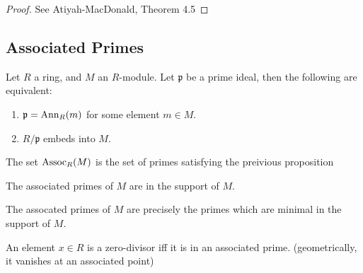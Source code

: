 \begin{proof}
    See Atiyah-MacDonald, Theorem 4.5
\end{proof}



\subsection{Associated Primes}


\begin{proposition}
  \label{prop:assoc_primes_def_equiv}
  Let $R$ a ring, and $M$ an $R$-module.
  Let $\mathfrak{p}$ be a prime ideal, 
  then 
  the following are equivalent:
  \begin{enumerate}[label=(\roman*)]
  \item $\mathfrak{p} = \operatorname{Ann}_R (m)$ for some element $m \in M$.
  \item $R / \mathfrak{p}$ embeds into $M$.
  \end{enumerate}
\end{proposition}

\begin{definition}
  \label{def:assoc_primes}
  The set $\operatorname{Assoc}_R (M)$ is the set of
  primes satisfying the preivious proposition
\end{definition}

\begin{proposition}
  \label{prop:assoc_primes_in_support}
  The associated primes of $M$ are in the
  support of $M$.
\end{proposition}

\begin{lemma}
  \label{lem:assoc_iff_minimal_in_support}
  The assocated primes of $M$ are precisely
  the primes which are minimal in the support of $M$.
\end{lemma}


\begin{lemma}
  \label{lem:assoc_prime_zero_divisor}
  An element $x \in R$ is a zero-divisor iff
  it is in an associated prime.
  (geometrically, it vanishes at an associated point)
\end{lemma}



